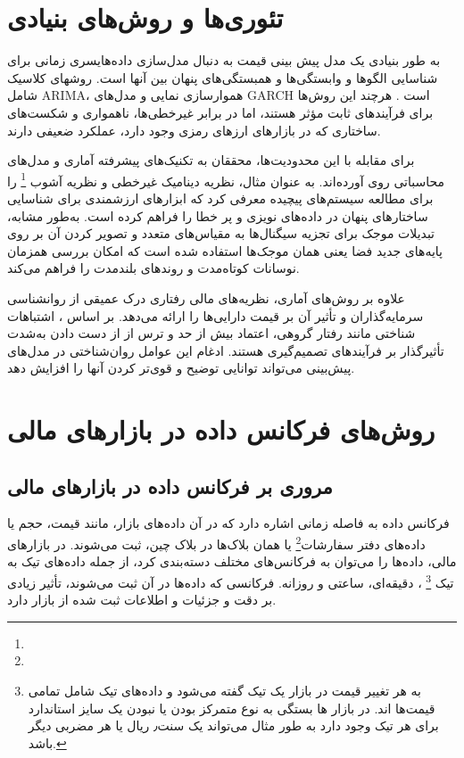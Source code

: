 \section{تئوری‌ها و روش‌های بنیادی}
به طور بنیادی یک مدل پیش بینی قیمت به دنبال مدل‌سازی داده‌هایسری زمانی برای شناسایی الگوها و وابستگی‌ها و همبستگی‌های پنهان بین آنها است. روشهای کلاسیک شامل ARIMA، هموارسازی نمایی و مدل‌های GARCH است \cite{box2015time}. هرچند این روش‌ها برای فرآیندهای ثابت مؤثر هستند، اما در برابر غیرخطی‌ها، ناهمواری و شکست‌های ساختاری که در بازارهای ارزهای رمزی وجود دارد، عملکرد ضعیفی دارند.

برای مقابله با این محدودیت‌ها، محققان به تکنیک‌های پیشرفته آماری و مدل‌های محاسباتی روی آورده‌اند. به عنوان مثال، \cite{tsay2010analysis} نظریه دینامیک غیرخطی و نظریه آشوب \footnote{} را برای مطالعه سیستم‌های پیچیده معرفی کرد که ابزارهای ارزشمندی برای شناسایی ساختارهای پنهان در داده‌های نویزی و پر خطا را فراهم کرده است. به‌طور مشابه، تبدیلات موجک \cite{mallat1999wavelet} برای تجزیه سیگنال‌ها به مقیاس‌های متعدد و تصویر کردن آن بر روی پایه‌های جدید فضا یعنی همان موجک‌ها استفاده شده است که امکان بررسی همزمان نوسانات کوتاه‌مدت و روندهای بلندمدت را فراهم می‌کند.

علاوه بر روش‌های آماری، نظریه‌های مالی رفتاری درک عمیقی از روانشناسی سرمایه‌گذاران و تأثیر آن بر قیمت دارایی‌ها را ارائه می‌دهد. بر اساس \cite{kahneman2011thinking}، اشتباهات شناختی مانند رفتار گروهی، اعتماد بیش از حد و ترس از از دست دادن به‌شدت تأثیرگذار بر فرآیندهای تصمیم‌گیری هستند. ادغام این عوامل روان‌شناختی در مدل‌های پیش‌بینی می‌تواند توانایی توضیح و قوی‌تر کردن آنها را افزایش دهد.

\section{روش‌های فرکانس داده در بازارهای مالی}

\subsection{مروری بر فرکانس داده در بازارهای مالی}
فرکانس داده به فاصله زمانی اشاره دارد که در آن داده‌های بازار، مانند قیمت، حجم یا داده‌های دفتر سفارشات\footnote{} یا همان بلاک‌ها در بلاک چین، ثبت می‌شوند. در بازارهای مالی، داده‌ها را می‌توان به فرکانس‌های مختلف دسته‌بندی کرد، از جمله داده‌های تیک به تیک \footnote{ به هر تغییر قیمت در بازار یک تیک گفته می‌شود و داده‌های تیک شامل تمامی قیمت‌ها اند. در بازار ها بستگی به نوع متمرکز بودن یا نبودن یک سایز استاندارد برای هر تیک وجود دارد به طور مثال می‌تواند یک سنت٫ ریال یا هر مضربی دیگر باشد.}
، دقیقه‌ای، ساعتی و روزانه. فرکانسی که داده‌ها در آن ثبت می‌شوند، تأثیر زیادی بر دقت و جزئیات و اطلاعات ثبت شده از بازار دارد.


